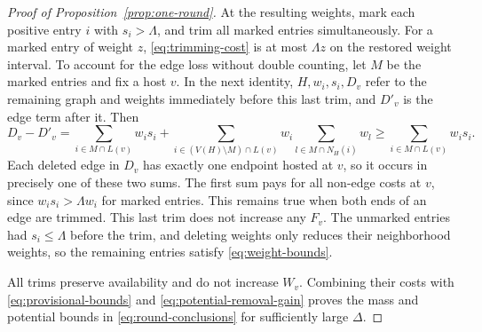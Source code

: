 \begin{proof}[Proof of Proposition~\ref{prop:one-round}]
At the resulting weights, mark each positive entry $i$ with
$s_i>\Lambda$, and trim all marked entries simultaneously.  For a
marked entry of weight $z$, \eqref{eq:trimming-cost} is at most
$\Lambda z$ on the restored weight interval.  To account for the
edge loss without double counting, let $M$ be the marked entries and
fix a host $v$.  In the next identity, $H,w_i,s_i,D_v$ refer to the
remaining graph and weights immediately before this last trim, and
$D'_v$ is the edge term after it.  Then
\begin{equation}\label{eq:simultaneous-trimming-loss}
 D_v-D'_v
 =\sum_{i\in M\cap L(v)}w_is_i
  +\sum_{i\in (V(H)\setminus M)\cap L(v)}
       w_i\sum_{l\in M\cap N_H(i)}w_l
 \ge\sum_{i\in M\cap L(v)}w_is_i.
\end{equation}
Each deleted edge in $D_v$ has exactly one endpoint hosted at $v$, so
it occurs in precisely one of these two sums.  The first sum pays for
all non-edge costs at $v$, since $w_is_i>\Lambda w_i$ for marked
entries.  This remains true when both ends of an edge are trimmed.
This last trim does not
increase any $F_v$.  The unmarked entries had $s_i\le\Lambda$ before
the trim, and deleting weights only reduces their neighborhood
weights, so the remaining entries satisfy \eqref{eq:weight-bounds}.

All trims preserve availability and do not increase $W_v$.  Combining
their costs with \eqref{eq:provisional-bounds} and
\eqref{eq:potential-removal-gain} proves the mass and potential bounds
in \eqref{eq:round-conclusions} for sufficiently large $\Delta$.
\end{proof}
